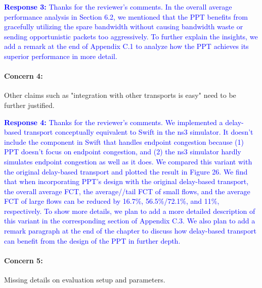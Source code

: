 \documentclass[12pt,one-column]{article}
\begin{document}
\noindent\textcolor{blue}{\textbf{Response 3:} 
Thanks for the reviewer’s comments. 
In the overall average performance analysis in Section 6.2, we mentioned that the PPT benefits from gracefully utilizing the spare bandwidth without causing bandwidth waste or sending opportunistic packets too aggressively.
To further explain the insights, we add a remark at the end of Appendix C.1 to analyze how the PPT achieves its superior performance in more detail.
}

{\it \paragraph{Concern 4:} Other claims such as "integration with other transports is easy" need to be further justified.}


\noindent\textcolor{blue}{\textbf{Response 4:} 
Thanks for the reviewer's comments. 
We implemented a delay-based transport conceptually equivalent to Swift in the ns3 simulator.
It doesn't include the component in Swift that handles endpoint congestion because (1) PPT doesn't focus on endpoint congestion, and (2) the ns3 simulator hardly simulates endpoint congestion as well as it does. 
We compared this variant with the original delay-based transport and plotted the result in Figure 26.
We find that when incorporating PPT's design with the original delay-based transport, the overall average FCT, the average//tail FCT of small flows, and the average FCT of large flows can be reduced by 16.7\%, 56.5\%/72.1\%, and 11\%, respectively.
To show more details, we plan to add a more detailed description of this variant in the corresponding section of Appendix C.3.
We also plan to add a remark paragraph at the end of the chapter to discuss how delay-based transport can benefit from the design of the PPT in further depth.
}

{\it \paragraph{Concern 5:}Missing details on evaluation setup and parameters.}
\end{document}
